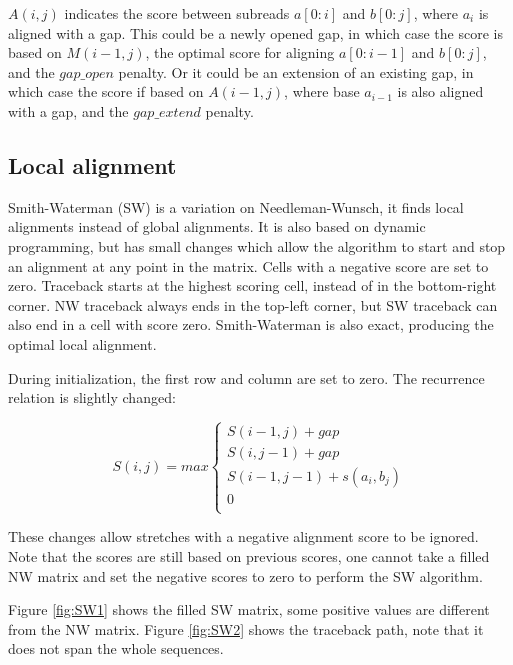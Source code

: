 \documentclass[../main/thesis.tex]{subfiles}
\begin{document}
$A(i,j)$ indicates the score between subreads $a[0:i]$ and $b[0:j]$, where $a_i$ is aligned with a gap.
This could be a newly opened gap, in which case the score is based on $M(i-1,j)$, the optimal score for aligning $a[0:i-1]$ and $b[0:j]$, and the $gap\_open$ penalty.
Or it could be an extension of an existing gap, in which case the score if based on $A(i-1,j)$, where base $a_{i-1}$ is also aligned with a gap, and the $gap\_extend$ penalty.


\subsection{Local alignment}
Smith-Waterman (SW)\cite{SW} is a variation on Needleman-Wunsch, it finds local alignments instead of global alignments.
It is also based on dynamic programming, but has small changes which allow the algorithm to start and stop an alignment at any point in the matrix.
Cells with a negative score are set to zero.
Traceback starts at the highest scoring cell, instead of in the bottom-right corner.
NW traceback always ends in the top-left corner, but SW traceback can also end in a cell with score zero.
Smith-Waterman is also exact, producing the optimal local alignment.

During initialization, the first row and column are set to zero.
The recurrence relation is slightly changed:

\begin{equation}
S(i,j) = max
\begin{cases}
S(i-1,j) + gap \\
S(i,j-1) + gap \\
S(i-1,j-1) + s(a_i,b_j) \\
0 \\
\end{cases}
\label{eq:SW_recursion}
\end{equation}

These changes allow stretches with a negative alignment score to be ignored.
Note that the scores are still based on previous scores, one cannot take a filled NW matrix and set the negative scores to zero to perform the SW algorithm.

Figure \ref{fig:SW1} shows the filled SW matrix, some positive values are different from the NW matrix.
Figure \ref{fig:SW2} shows the traceback path, note that it does not span the whole sequences.

\end{document}
